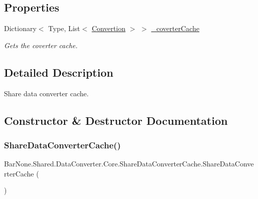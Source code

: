 \subsection*{Properties}
\begin{DoxyCompactItemize}
\item 
Dictionary$<$ Type, List$<$ \mbox{\hyperlink{struct_bar_none_1_1_shared_1_1_data_converter_1_1_core_1_1_convertion}{Convertion}} $>$ $>$ \mbox{\hyperlink{class_bar_none_1_1_shared_1_1_data_converter_1_1_core_1_1_share_data_converter_cache_a95827a6cad635e009450d52cd4f8623d}{\+\_\+coverter\+Cache}}
\begin{DoxyCompactList}\small\item\em Gets the coverter cache. \end{DoxyCompactList}\end{DoxyCompactItemize}


\subsection{Detailed Description}
Share data converter cache. 



\subsection{Constructor \& Destructor Documentation}
\mbox{\label{class_bar_none_1_1_shared_1_1_data_converter_1_1_core_1_1_share_data_converter_cache_aa6b15c911425dad6e0912ecf841248f4}} 
\subsubsection{\texorpdfstring{Share\+Data\+Converter\+Cache()}{ShareDataConverterCache()}}
{\footnotesize\ttfamily Bar\+None.\+Shared.\+Data\+Converter.\+Core.\+Share\+Data\+Converter\+Cache.\+Share\+Data\+Converter\+Cache (\begin{DoxyParamCaption}{ }\end{DoxyParamCaption})}



